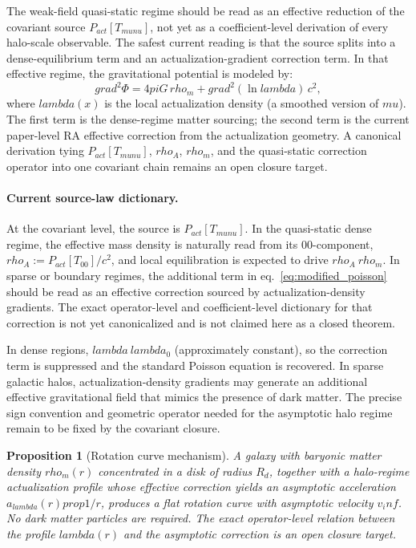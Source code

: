 \documentclass[11pt]{article}
\def\rho{rho}%
\def\mu{mu}%
\def\lambda{lambda}%
\def\nu{nu}%
\def\pi{pi}%
\def\mathrm#1{#1}%
\def\approx{~}%
\def\infty{inf}%
\def\nabla{grad}%
\def\propto{prop}%
\newtheorem{proposition}{Proposition}
\begin{document}
The weak-field quasi-static regime should be read as an effective reduction of the covariant source $P_{\mathrm{act}}[T_{\mu\nu}]$, not yet as a coefficient-level derivation of every halo-scale observable. The safest current reading is that the source splits into a dense-equilibrium term and an actualization-gradient correction term. In that effective regime, the gravitational potential is modeled by:
\begin{equation}
\label{eq:modified_poisson}
\nabla^2\Phi = 4\pi G\,\rho_m + \nabla^2(\ln\lambda)\,c^2,
\end{equation}
where $\lambda(x)$ is the local actualization density (a smoothed version of $\mu$). The first term is the dense-regime matter sourcing; the second term is the current paper-level RA effective correction from the actualization geometry. A canonical derivation tying $P_{\mathrm{act}}[T_{\mu\nu}]$, $\rho_{\mathrm{A}}$, $\rho_m$, and the quasi-static correction operator into one covariant chain remains an open closure target.

\paragraph{Current source-law dictionary.}
At the covariant level, the source is $P_{\mathrm{act}}[T_{\mu\nu}]$. In the quasi-static dense regime, the effective mass density is naturally read from its $00$-component, $\rho_{\mathrm{A}} := P_{\mathrm{act}}[T_{00}]/c^2$, and local equilibration is expected to drive $\rho_{\mathrm{A}} \approx \rho_m$. In sparse or boundary regimes, the additional term in eq.~\ref{eq:modified_poisson} should be read as an effective correction sourced by actualization-density gradients. The exact operator-level and coefficient-level dictionary for that correction is not yet canonicalized and is not claimed here as a closed theorem.

In dense regions, $\lambda \approx \lambda_0$ (approximately constant), so the correction term is suppressed and the standard Poisson equation is recovered. In sparse galactic halos, actualization-density gradients may generate an additional effective gravitational field that mimics the presence of dark matter. The precise sign convention and geometric operator needed for the asymptotic halo regime remain to be fixed by the covariant closure.

\begin{proposition}[Rotation curve mechanism]
\label{prop:rotation_curve}
A galaxy with baryonic matter density $\rho_m(r)$ concentrated in a disk of radius $R_d$, together with a halo-regime actualization profile whose effective correction yields an asymptotic acceleration $a_{\lambda}(r) \propto 1/r$, produces a flat rotation curve with asymptotic velocity $v_\infty$. No dark matter particles are required. The exact operator-level relation between the profile $\lambda(r)$ and the asymptotic correction is an open closure target.
\end{proposition}
\end{document}
